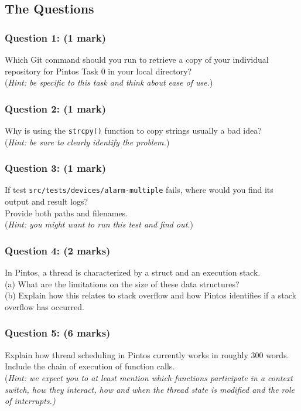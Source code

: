 \documentclass[a4paper,12pt]{article}
\newcommand{\shell}[1]{\lstinline!#1!}
\begin{document}
\subsection*{The Questions}

\subsubsection*{Question 1: (1 mark)} \vspace{-0.1em}
Which Git command should you run to retrieve a copy of your individual repository for Pintos Task 0 in your local directory? \\
(\textit{Hint: be specific to this task and think about ease of use.})

\subsubsection*{Question 2: (1 mark)} \vspace{-0.1em}
Why is using the {\tt strcpy()} function to copy strings usually a bad idea? \\
(\textit{Hint: be sure to clearly identify the problem.})

\subsubsection*{Question 3: (1 mark)} \vspace{-0.1em}
If test \shell{src/tests/devices/alarm-multiple} fails, where would you find its output and result logs? \\
Provide both paths and filenames. \\
(\textit{Hint: you might want to run this test and find out.}) 
 
\subsubsection*{Question 4: (2 marks)} \vspace{-0.1em}
In Pintos, a thread is characterized by a struct and an execution stack. \\
(a) What are the limitations on the size of these data structures? \\
(b) Explain how this relates to stack overflow and how Pintos identifies if a stack overflow has occurred.

\subsubsection*{Question 5: (6 marks)} \vspace{-0.1em}
Explain how thread scheduling in Pintos currently works in roughly 300 words. 
Include the chain of execution of function calls. \\
(\textit{Hint: we expect you to at least mention which functions participate in a context switch, how they interact, how and when the thread state is modified and the role of interrupts.)}
\end{document}
